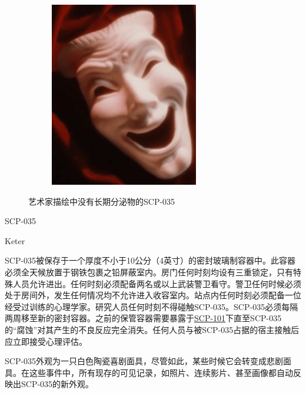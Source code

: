 \begin{figure}[H]
\begin{subfigure}[b]{0.4\textwidth}
        \includegraphics[width=\linewidth]{images/SCP.035.1.png}
    \end{subfigure}
    \caption*{艺术家描绘中没有长期分泌物的SCP-035}
\end{figure}

SCP-035

Keter

SCP-035被保存于一个厚度不小于10公分（4英寸）的密封玻璃制容器中。此容器必须全天候放置于钢铁包裹之铅屏蔽室内。房门任何时刻均设有三重锁定，只有特殊人员允许进出。任何时刻必须配备两名或以上武装警卫看守。警卫任何时候必须处于房间外，发生任何情况均不允许进入收容室内。站点内任何时刻必须配备一位经受过训练的心理学家。研究人员任何时刻不得碰触SCP-035。SCP-035必须每隔两周移至新的密封容器。之前的保管容器需要暴露于\hyperref[chap:SCP-101]{SCP-101}下直至SCP-035的“腐蚀”对其产生的不良反应完全消失。任何人员与被SCP-035占据的宿主接触后应立即接受心理评估。

SCP-035外观为一只白色陶瓷喜剧面具，尽管如此，某些时候它会转变成悲剧面具。在这些事件中，所有现存的可见记录，如照片、连续影片、甚至画像都自动反映出SCP-035的新外观。

